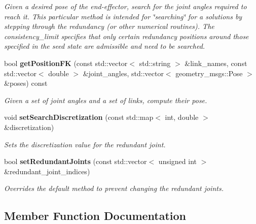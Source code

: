 \begin{DoxyCompactItemize}
\begin{DoxyCompactList}\small\item\em Given a desired pose of the end-\/effector, search for the joint angles required to reach it. This particular method is intended for \char`\"{}searching\char`\"{} for a solutions by stepping through the redundancy (or other numerical routines). The consistency\-\_\-limit specifies that only certain redundancy positions around those specified in the seed state are admissible and need to be searched. \end{DoxyCompactList}\item 
bool {\bf get\-Position\-F\-K} (const std\-::vector$<$ std\-::string $>$ \&link\-\_\-names, const std\-::vector$<$ double $>$ \&joint\-\_\-angles, std\-::vector$<$ geometry\-\_\-msgs\-::\-Pose $>$ \&poses) const 
\begin{DoxyCompactList}\small\item\em Given a set of joint angles and a set of links, compute their pose. \end{DoxyCompactList}\item 
void {\bf set\-Search\-Discretization} (const std\-::map$<$ int, double $>$ \&discretization)
\begin{DoxyCompactList}\small\item\em Sets the discretization value for the redundant joint. \end{DoxyCompactList}\item 
bool {\bf set\-Redundant\-Joints} (const std\-::vector$<$ unsigned int $>$ \&redundant\-\_\-joint\-\_\-indices)\label{classikfast__kinematics__plugin_1_1_i_k_fast_kinematics_plugin_a21ad0e4446318810521cae1bda0cb9ea}

\begin{DoxyCompactList}\small\item\em Overrides the default method to prevent changing the redundant joints. \end{DoxyCompactList}\end{DoxyCompactItemize}


\subsection{Member Function Documentation}
